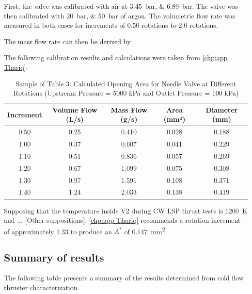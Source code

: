             First, the valve was calibrated with air at \qtylist{3.45;6.89}{bar}. The valve was then calibrated with \qtylist{20;50}{bar} of argon. The volumetric flow rate was measured in both cases for increments of 0.50 rotations to 2.0 rotations.

            The mass flow rate can then be derived by 

            The following calibration results and calculations were taken from \autoref{chp:app Thariq}:

            \begin{table}[!ht]
                \centering
                \caption{Sample of Table 3: Calculated Opening Area for Needle Valve at Different Rotations (Upstream Pressure = 5000 kPa and Outlet Pressure = 100 kPa)}
                \label{tab:opening_area}
                \begin{tabular}{|c|c|c|c|c|}
                \hline
                \textbf{Increment} & \textbf{Volume Flow (L/s)} & \textbf{Mass Flow (g/s)} & \textbf{Area (mm²)} & \textbf{Diameter (mm)} \\ \hline
                0.50 & 0.25 & 0.410 & 0.028 & 0.188 \\ \hline
                1.00 & 0.37 & 0.607 & 0.041 & 0.229 \\ \hline
                1.10 & 0.51 & 0.836 & 0.057 & 0.269 \\ \hline
                1.20 & 0.67 & 1.099 & 0.075 & 0.308 \\ \hline
                1.30 & 0.97 & 1.591 & 0.108 & 0.371 \\ \hline
                1.40 & 1.24 & 2.033 & 0.138 & 0.419 \\ \hline
                \end{tabular}
            \end{table}

            Supposing that the temperature inside V2 during CW LSP thrust tests is \qty{1200}{K} and ... [Other suppositions], \autoref{chp:app Thariq} recommends a rotation increment of approximately 1.33 to produce an $A^*$ of \qty{0.147}{mm^2}. 

        \subsection{Summary of results}

            The following table presents a summary of the results determined from cold flow thruster characterization.

